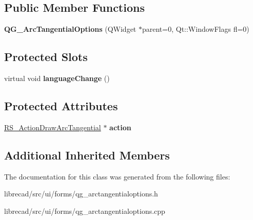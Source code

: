 \subsection*{Public Member Functions}
\begin{DoxyCompactItemize}
\item 
\hypertarget{classQG__ArcTangentialOptions_a6f8e7e170d92967820a635f5a2bcd5e1}{{\bfseries Q\-G\-\_\-\-Arc\-Tangential\-Options} (Q\-Widget $\ast$parent=0, Qt\-::\-Window\-Flags fl=0)}\label{classQG__ArcTangentialOptions_a6f8e7e170d92967820a635f5a2bcd5e1}

\end{DoxyCompactItemize}
\subsection*{Protected Slots}
\begin{DoxyCompactItemize}
\item 
\hypertarget{classQG__ArcTangentialOptions_ac3b90134c4ea87a71e90daebe25c39fc}{virtual void {\bfseries language\-Change} ()}\label{classQG__ArcTangentialOptions_ac3b90134c4ea87a71e90daebe25c39fc}

\end{DoxyCompactItemize}
\subsection*{Protected Attributes}
\begin{DoxyCompactItemize}
\item 
\hypertarget{classQG__ArcTangentialOptions_a58d21ea144cb69439bcb046e852d2975}{\hyperlink{classRS__ActionDrawArcTangential}{R\-S\-\_\-\-Action\-Draw\-Arc\-Tangential} $\ast$ {\bfseries action}}\label{classQG__ArcTangentialOptions_a58d21ea144cb69439bcb046e852d2975}

\end{DoxyCompactItemize}
\subsection*{Additional Inherited Members}


The documentation for this class was generated from the following files\-:\begin{DoxyCompactItemize}
\item 
librecad/src/ui/forms/qg\-\_\-arctangentialoptions.\-h\item 
librecad/src/ui/forms/qg\-\_\-arctangentialoptions.\-cpp\end{DoxyCompactItemize}

